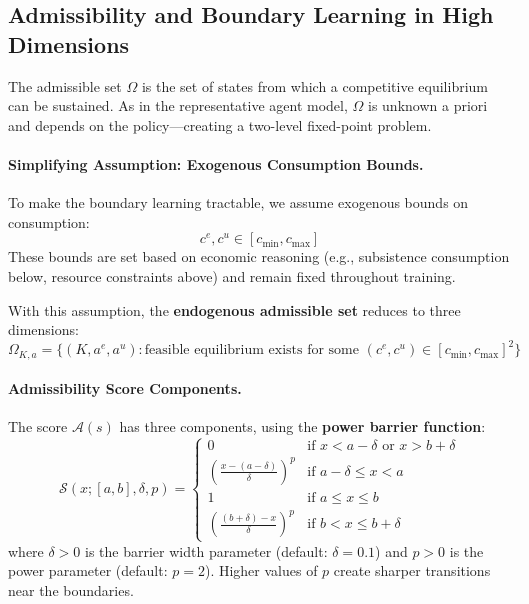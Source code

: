 \subsection{Admissibility and Boundary Learning in High Dimensions}

The admissible set $\Omega$ is the set of states from which a competitive equilibrium can be sustained. As in the representative agent model, $\Omega$ is unknown a priori and depends on the policy---creating a two-level fixed-point problem.

\paragraph{Simplifying Assumption: Exogenous Consumption Bounds.}
To make the boundary learning tractable, we assume exogenous bounds on consumption:
\begin{equation}
    c^e, c^u \in [c_{\min}, c_{\max}]
\end{equation}
These bounds are set based on economic reasoning (e.g., subsistence consumption below, resource constraints above) and remain fixed throughout training.

With this assumption, the \textbf{endogenous admissible set} reduces to three dimensions:
\begin{equation}
    \Omega_{K,a} = \{(K, a^e, a^u) : \text{feasible equilibrium exists for some } (c^e, c^u) \in [c_{\min}, c_{\max}]^2\}
\end{equation}

\paragraph{Admissibility Score Components.}
The score $\mathcal{A}(s)$ has three components, using the \textbf{power barrier function}:
\begin{equation}
    \mathcal{S}(x; [a, b], \delta, p) = \begin{cases}
        0 & \text{if } x < a - \delta \text{ or } x > b + \delta \\
        \left(\frac{x - (a - \delta)}{\delta}\right)^p & \text{if } a - \delta \leq x < a \\
        1 & \text{if } a \leq x \leq b \\
        \left(\frac{(b + \delta) - x}{\delta}\right)^p & \text{if } b < x \leq b + \delta
    \end{cases}
\end{equation}
where $\delta > 0$ is the barrier width parameter (default: $\delta = 0.1$) and $p > 0$ is the power parameter (default: $p = 2$). Higher values of $p$ create sharper transitions near the boundaries.

